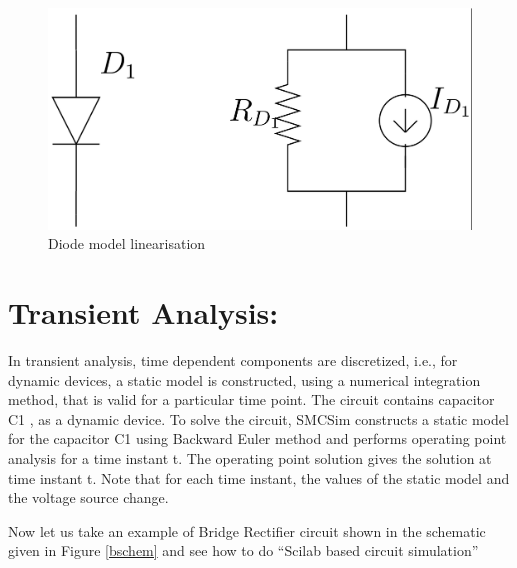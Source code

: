 \begin{figure}[h]%
\begin{center}
\includegraphics[width=1\linewidth]{figures/diode-linearization.png}%
\caption{Diode model linearisation}
\label{lin}
\end{center}
\end{figure}




\section {Transient Analysis:}

In transient analysis, time dependent components are discretized, i.e., for dynamic devices, a static model is constructed, using a numerical integration method, that is valid for a particular time point. The circuit contains capacitor C1 , as a dynamic device. To solve the circuit, SMCSim constructs a static model for the capacitor C1 using Backward Euler method and performs operating point analysis for a time instant t. The operating point solution gives the solution at time instant t. Note that for each time instant, the values of the static model and the voltage source change. 

Now let us take an example of Bridge Rectifier circuit shown in the schematic given in Figure \ref{bschem} and see how to do “Scilab based circuit simulation”



